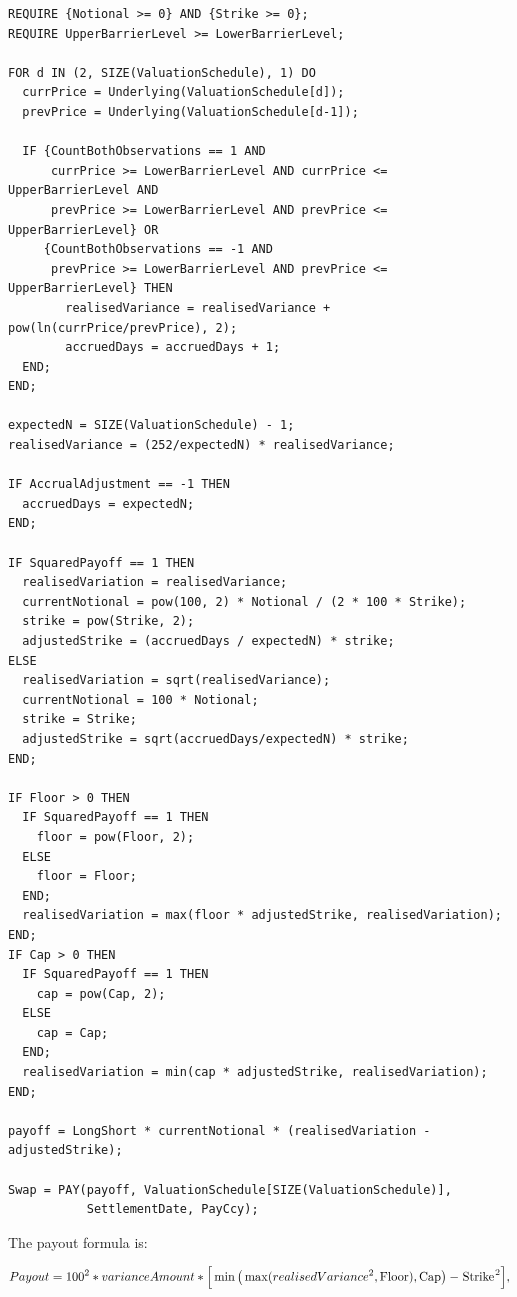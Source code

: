\begin{listing}[hbt]
\begin{verbatim}
REQUIRE {Notional >= 0} AND {Strike >= 0};
REQUIRE UpperBarrierLevel >= LowerBarrierLevel;

FOR d IN (2, SIZE(ValuationSchedule), 1) DO
  currPrice = Underlying(ValuationSchedule[d]);
  prevPrice = Underlying(ValuationSchedule[d-1]);

  IF {CountBothObservations == 1 AND
      currPrice >= LowerBarrierLevel AND currPrice <= UpperBarrierLevel AND
      prevPrice >= LowerBarrierLevel AND prevPrice <= UpperBarrierLevel} OR
     {CountBothObservations == -1 AND
      prevPrice >= LowerBarrierLevel AND prevPrice <= UpperBarrierLevel} THEN
        realisedVariance = realisedVariance + pow(ln(currPrice/prevPrice), 2);
        accruedDays = accruedDays + 1;
  END;
END;

expectedN = SIZE(ValuationSchedule) - 1;
realisedVariance = (252/expectedN) * realisedVariance;

IF AccrualAdjustment == -1 THEN
  accruedDays = expectedN;
END;

IF SquaredPayoff == 1 THEN
  realisedVariation = realisedVariance;
  currentNotional = pow(100, 2) * Notional / (2 * 100 * Strike);
  strike = pow(Strike, 2);
  adjustedStrike = (accruedDays / expectedN) * strike;
ELSE
  realisedVariation = sqrt(realisedVariance);
  currentNotional = 100 * Notional;
  strike = Strike;
  adjustedStrike = sqrt(accruedDays/expectedN) * strike;
END;

IF Floor > 0 THEN
  IF SquaredPayoff == 1 THEN
    floor = pow(Floor, 2);
  ELSE
    floor = Floor;
  END;
  realisedVariation = max(floor * adjustedStrike, realisedVariation);
END;
IF Cap > 0 THEN
  IF SquaredPayoff == 1 THEN
    cap = pow(Cap, 2);
  ELSE
    cap = Cap;
  END;
  realisedVariation = min(cap * adjustedStrike, realisedVariation);
END;

payoff = LongShort * currentNotional * (realisedVariation - adjustedStrike);

Swap = PAY(payoff, ValuationSchedule[SIZE(ValuationSchedule)],
           SettlementDate, PayCcy);
\end{verbatim}
\caption{Payoff script for a CorridorVarianceSwap.}
\label{lst:corridor_variance_swap}
\end{listing}

The payout formula is:

\begin{equation*}
  Payout = 100^2 * varianceAmount * \Big[ \min \big( \max (realisedVariance^2, \text{\lstinline!Floor!}), \text{\lstinline!Cap!}\big) - \text{\lstinline!Strike!}^2 \Big],
\end{equation*}

